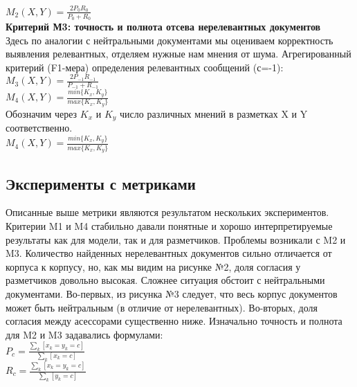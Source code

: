 \documentclass{article}
\begin{document}
\hspace{5cm}$M_2(X, Y) = \frac{2P_0R_0}{P_0+R_0}$\\

\textbf{Критерий М3: точность и полнота отсева нерелевантных документов}\\
Здесь по аналогии с нейтральными документами мы оцениваем корректность выявления релевантных, отделяем нужные нам мнения от шума. Агрегированный критерий (F1-мера) определения релевантных сообщений (с=-1):\\ 

\hspace{5cm}$M_3(X, Y) = \frac{2P_{-1}R_{-1}}{P_{-1}+R_{-1}}$\\

\hspace{5cm}$M_4(X, Y) = \frac{min\{K_x, K_y\}}{max\{K_x, K_y\}}$\\
Обозначим через $K_x$ и $K_y$ число различных мнений в разметках X и Y соответственно.\\

\hspace{5cm}$M_4(X, Y) = \frac{min\{K_x, K_y\}}{max\{K_x, K_y\}}$\\


\subsection{Эксперименты с метриками}
Описанные выше метрики являются результатом нескольких экспериментов. Критерии M1 и M4 стабильно давали понятные и хорошо интерпретируемые результаты как для модели, так и для разметчиков. Проблемы возникали с M2 и M3. Количество найденных нерелевантных документов сильно отличается от корпуса к корпусу, но, как мы видим на рисунке №2, доля согласия у разметчиков довольно высокая. Сложнее ситуация обстоит с нейтральными документами. Во-первых, из рисунка №3 следует, что весь корпус документов может быть нейтральным (в отличие от нерелевантных). Во-вторых, доля согласия между асессорами существенно ниже.
\label{old_metrics}
Изначально точность и полнота для M2 и M3 задавались формулами:\\

\hspace{5cm}$P_c = \frac{\sum_{k} [x_k=y_k=c]}{\sum_{k} [x_k=c]}$\\

\hspace{5cm}$R_c = \frac{\sum_{k} [x_k=y_k=c]}{\sum_{k} [y_k=c]}$\\
\end{document}
